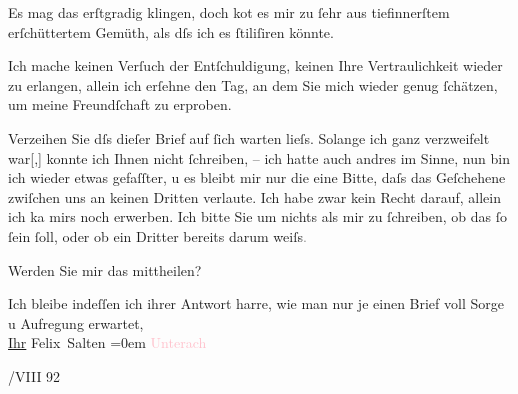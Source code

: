 \pstart
           Es mag das erſtgradig klingen, doch ko{\geminationm}t es mir zu ſehr
               aus tiefinnerſtem erſchüttertem Gemüth, als dſs ich es ſtiliſiren könnte.\pend
           
\pstart
           Ich mache keinen Verſuch der Entſchuldigung, keinen Ihre Vertraulichkeit wieder zu
                  er{\pb}langen, allein ich
               erſehne den Tag, an dem Sie mich wieder genug ſchätzen, um meine Freundſchaft zu
               erproben.\pend
           
\pstart
           Verzeihen Sie dſs dieſer Brief auf ſich warten lieſs. Solange
               ich ganz verzweifelt war{[},{]} konnte ich Ihnen nicht ſchreiben, –
               ich hatte auch andres im Sinne, nun bin ich wieder etwas gefaſſter, u es bleibt mir
               nur die eine Bitte, daſs das Geſchehene zwiſchen uns an keinen Dritten verlaute. Ich
               habe zwar kein Recht darauf, allein ich ka{\geminationn} mirs noch
               erwerben. Ich bitte Sie um nichts als mir zu ſchreiben, ob das ſo ſein ſoll, oder ob
               ein {\pb}Dritter bereits darum
                  weiſs\textcolor{gray}{.}\pend
           
\pstart
           Werden Sie mir das mittheilen?\pend
           
\pstart
           Ich bleibe indeſſen ich ihrer Antwort harre, wie man nur je einen Brief voll
               Sorge u Aufregung erwartet, {\\[\baselineskip]}\uline{Ihr}{ }\spacefill\mbox{Felix Salten}\pend
           \leftskip=0em{}
\pstart
           \noindent{}\textcolor{pink}{Unterach}{}\ledrightnote{\textcolor{pink}{Unterach am Attersee}}\pend
           
/VIII 92\pend
           \endnumbering{}  
      